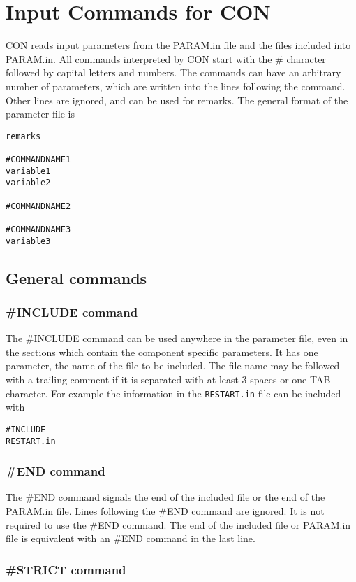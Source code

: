 \section{Input Commands for CON}

CON reads input parameters from the PARAM.in file and the files
included into PARAM.in. All commands interpreted by CON start
with the \# character followed by capital letters and numbers.
The commands can have an arbitrary number of parameters, 
which are written into the lines following the command. 
Other lines are ignored, and can be used for remarks.
The general format of the parameter file is
\begin{verbatim}
remarks

#COMMANDNAME1
variable1
variable2

#COMMANDNAME2

#COMMANDNAME3
variable3
\end{verbatim}

\subsection{General commands}

\subsubsection{\#INCLUDE command}

The \#INCLUDE command can be used anywhere in the parameter file,
even in the sections which contain the component specific parameters.
It has one parameter, the name of the file to be included.
The file name may be followed with a trailing comment if it
is separated with at least 3 spaces or one TAB character.
For example the information in the {\tt RESTART.in} file can be
included with
\begin{verbatim}
#INCLUDE
RESTART.in
\end{verbatim}

\subsubsection{\#END command}

The \#END command signals the end of the included file or the
end of the PARAM.in file. Lines following the \#END command are
ignored. It is not required to use the \#END command. The end
of the included file or PARAM.in file is equivalent with an \#END command
in the last line.

\subsubsection{\#STRICT command}

